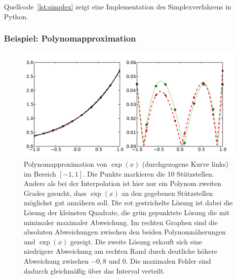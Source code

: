 Quellcode~\ref{lst:simplex} zeigt eine Implementation des
Simplexverfahrens in Python.

\subsubsection{Beispiel: Polynomapproximation}

\begin{figure}[t]
  \centering
  \includegraphics[width=\textwidth]{plots/qr_simplex_example}
  \caption{Polynomapproximation von $\exp(x)$ (durchgezogene Kurve
    links) im Bereich $[-1,1]$. Die Punkte markieren die 10
    Stützstellen. Anders als bei der Interpolation ist hier nur ein
    Polynom zweiten Grades gesucht, dass $\exp(x)$ an den gegebenen
    Stützstellen möglichst gut annähern soll. Die rot gestrichelte
    Lösung ist dabei die Lösung der kleinsten Quadrate, die grün
    gepunktete Lösung die mit minimaler maximaler Abweichung. Im
    rechten Graphen sind die absoluten Abweichungen zwischen den
    beiden Polynomnäherungen und $\exp(x)$ gezeigt. Die zweite Lösung
    erkauft sich eine niedrigere Abweichung am rechten Rand durch
    deutliche höhere Abweichung zwischen $-0,8$ und $0$. Die maximalen
    Fehler sind dadurch gleichmäßig über das Interval verteilt.}
  \label{fig:polyapprox}
\end{figure}

